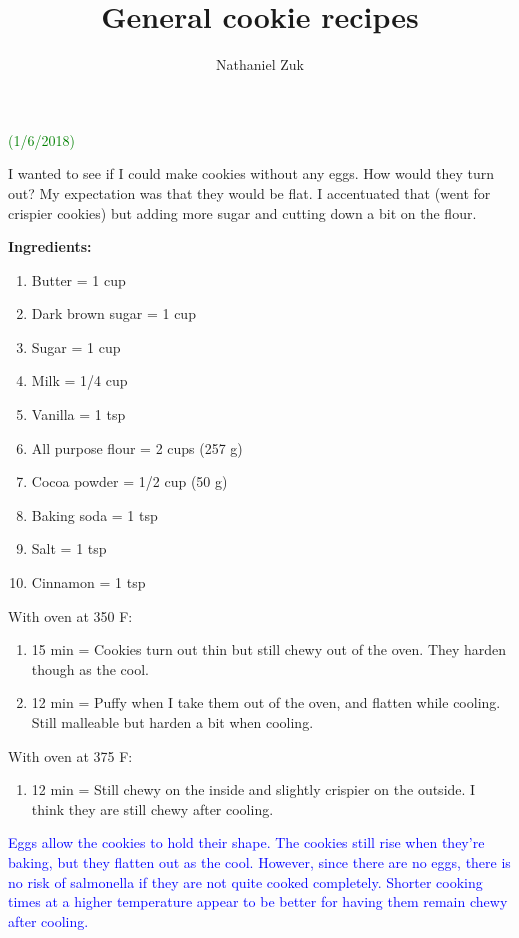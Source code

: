 \documentclass[11pt]{article}
\title{General cookie recipes}
\author{Nathaniel Zuk}
\begin{document}
\maketitle

\textcolor{green}{(1/6/2018)}

I wanted to see if I could make cookies without any eggs.  How would they turn out?  My expectation was that they would be flat.  I accentuated that (went for crispier cookies) but adding more sugar and cutting down a bit on the flour.

\textbf{Ingredients:}

\begin{enumerate}
\item Butter = 1 cup
\item Dark brown sugar = 1 cup
\item Sugar = 1 cup
\item Milk = 1/4 cup
\item Vanilla = 1 tsp
\item All purpose flour = 2 cups (257 g)
\item Cocoa powder = 1/2 cup (50 g)
\item Baking soda = 1 tsp
\item Salt = 1 tsp
\item Cinnamon = 1 tsp
\end{enumerate}

With oven at 350 F:

\begin{enumerate}
\item 15 min = Cookies turn out thin but still chewy out of the oven.  They harden though as the cool.
\item 12 min = Puffy when I take them out of the oven, and flatten while cooling.  Still malleable but harden a bit when cooling.
\end{enumerate}

With oven at 375 F:

\begin{enumerate}
\item 12 min = Still chewy on the inside and slightly crispier on the outside.  I think they are still chewy after cooling.
\end{enumerate}

\textcolor{blue}{Eggs allow the cookies to hold their shape.  The cookies still rise when they're baking, but they flatten out as the cool.  However, since there are no eggs, there is no risk of salmonella if they are not quite cooked completely.  Shorter cooking times at a higher temperature appear to be better for having them remain chewy after cooling.}
\end{document}
